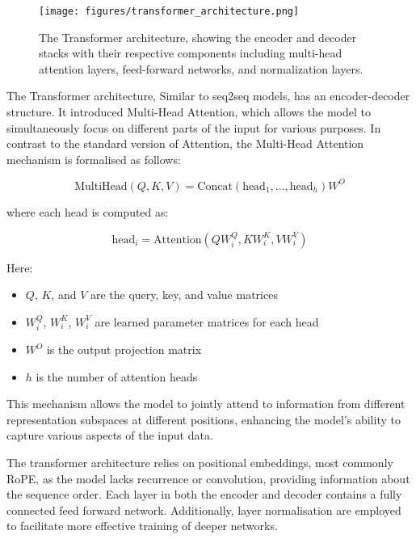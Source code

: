 \documentclass[a4paper, oneside]{discothesis}
\begin{document}
\begin{figure}[h]
    \centering
    \texttt{[image: figures/transformer\_architecture.png]}
    \caption{The Transformer architecture, showing the encoder and decoder stacks with their respective components including multi-head attention layers, feed-forward networks, and normalization layers.}
    \label{fig:transformer_architecture}
\end{figure}


The Transformer architecture, Similar to seq2seq models, has an encoder-decoder structure. It introduced Multi-Head Attention, which allows the model to simultaneously focus on different parts of the input for various purposes. In contrast to the standard version of Attention, the Multi-Head Attention mechanism is formalised as follows:

\begin{equation}
\text{MultiHead}(Q, K, V) = \text{Concat}(\text{head}_1, ..., \text{head}_h)W^O
\end{equation}

where each head is computed as:

\begin{equation}
\text{head}_i = \text{Attention}(QW_i^Q, KW_i^K, VW_i^V)
\end{equation}

Here:
\begin{itemize}
    \item $Q$, $K$, and $V$ are the query, key, and value matrices
    \item $W_i^Q$, $W_i^K$, $W_i^V$ are learned parameter matrices for each head
    \item $W^O$ is the output projection matrix
    \item $h$ is the number of attention heads
\end{itemize}

This mechanism allows the model to jointly attend to information from different representation subspaces at different positions, enhancing the model's ability to capture various aspects of the input data.

The transformer architecture relies on positional embeddings, most commonly RoPE, as the model lacks recurrence or convolution, providing information about the sequence order. Each layer in both the encoder and decoder contains a fully connected feed forward network. Additionally, layer normalisation are employed to facilitate more effective training of deeper networks.
\end{document}
